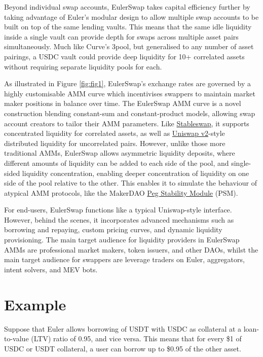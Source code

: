 \documentclass{article}
\begin{document}
Beyond individual swap accounts, EulerSwap takes capital efficiency further by taking advantage of Euler's modular design to allow multiple swap accounts to be built on top of the same lending vaults. This means that the same idle liquidity inside a single vault can provide depth for swaps across multiple asset pairs simultaneously. Much like Curve’s 3pool, but generalised to any number of asset pairings, a USDC vault could provide deep liquidity for 10+ correlated assets without requiring separate liquidity pools for each.

As illustrated in Figure \ref{fig:fig1}, EulerSwap’s exchange rates are governed by a highly customisable AMM curve which incentivises swappers to maintain market maker positions in balance over time. The EulerSwap AMM curve is a novel construction blending constant-sum and constant-product models, allowing swap account creators to tailor their AMM parameters. Like \href{https://berkeley-defi.github.io/assets/material/StableSwap.pdf}{Stableswap}, it supports concentrated liquidity for correlated assets, as well as \href{https://app.uniswap.org/whitepaper.pdf}{Uniswap v2}-style distributed liquidity for uncorrelated pairs. However, unlike those more traditional AMMs, EulerSwap allows asymmetric liquidity deposits, where different amounts of liquidity can be added to each side of the pool, and single-sided liquidity concentration, enabling deeper concentration of liquidity on one side of the pool relative to the other. This enables it to simulate the behaviour of atypical AMM protocols, like the MakerDAO \href{https://mips.makerdao.com/mips/details/MIP29}{Peg Stability Module} (PSM).

For end-users, EulerSwap functions like a typical Uniswap-style interface. However, behind the scenes, it incorporates advanced mechanisms such as borrowing and repaying, custom pricing curves, and dynamic liquidity provisioning. The main target audience for liquidity providers in EulerSwap AMMs are professional market makers, token issuers, and other DAOs, whilst the main target audience for swappers are leverage traders on Euler, aggregators, intent solvers, and MEV bots.  

\section{Example}

Suppose that Euler allows borrowing of USDT with USDC as collateral at a loan-to-value (LTV) ratio of 0.95, and vice versa. This means that for every \$1 of USDC or USDT collateral, a user can borrow up to \$0.95 of the other asset. 
\end{document}
